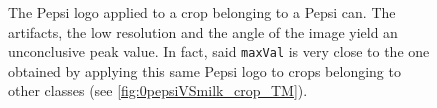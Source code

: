 \documentclass[../main.tex]{subfiles}
\begin{document}
\begin{figure}[H]
    \centering
    \caption{The Pepsi logo applied to a crop belonging to a Pepsi can. The artifacts, the low resolution and the angle of the image yield an unconclusive peak value. In fact, said \texttt{maxVal} is very close to the one obtained by applying this same Pepsi logo to crops belonging to other classes (see \ref{fig:0pepsiVSmilk_crop_TM}).}
    \label{fig:4pepsi_crop_TM}
\end{figure}
\end{document}

